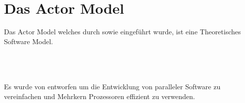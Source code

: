 \chapter{Das Actor Model}
Das Actor Model welches durch \cite{hewitt1973session} sowie \cite{Agha1985ActorsSystems} eingeführt wurde, ist eine Theoretisches Software Model. 
\citet{hewitt1973session} \\
\citep{hewitt1973session} \\
\citeauthor{hewitt1973session} \\
\citealt{hewitt1973session} \\

\cite{Auth123}

Es wurde von \cite{hewitt1973session} entworfen um die Entwicklung von paralleler Software zu vereinfachen und Mehrkern Prozessoren effizient zu verwenden.